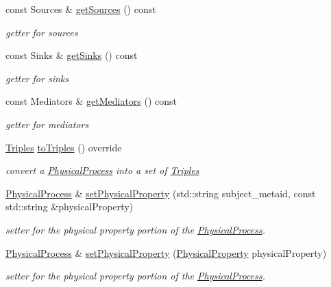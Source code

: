 \begin{DoxyCompactItemize}
const Sources \& \hyperlink{classomexmeta_1_1PhysicalProcess_ab5f3100febc21173775a2090bb57a0fb}{get\+Sources} () const
\begin{DoxyCompactList}\small\item\em getter for sources \end{DoxyCompactList}\item 
const Sinks \& \hyperlink{classomexmeta_1_1PhysicalProcess_a069e7caa05f346f90f413f650f081535}{get\+Sinks} () const
\begin{DoxyCompactList}\small\item\em getter for sinks \end{DoxyCompactList}\item 
const Mediators \& \hyperlink{classomexmeta_1_1PhysicalProcess_a349b76ad1831d2510904510583f0d7f2}{get\+Mediators} () const
\begin{DoxyCompactList}\small\item\em getter for mediators \end{DoxyCompactList}\item 
\hyperlink{classomexmeta_1_1Triples}{Triples} \hyperlink{classomexmeta_1_1PhysicalProcess_ab6f6af00fac2401f9a88e186fd1d897a}{to\+Triples} () override
\begin{DoxyCompactList}\small\item\em convert a \hyperlink{classomexmeta_1_1PhysicalProcess}{Physical\+Process} into a set of \hyperlink{classomexmeta_1_1Triples}{Triples} \end{DoxyCompactList}\item 
\hyperlink{classomexmeta_1_1PhysicalProcess}{Physical\+Process} \& \hyperlink{classomexmeta_1_1PhysicalProcess_ac875058d67408246aa28cf58dd77ccf6}{set\+Physical\+Property} (std\+::string subject\+\_\+metaid, const std\+::string \&physical\+Property)
\begin{DoxyCompactList}\small\item\em setter for the physical property portion of the \hyperlink{classomexmeta_1_1PhysicalProcess}{Physical\+Process}. \end{DoxyCompactList}\item 
\hyperlink{classomexmeta_1_1PhysicalProcess}{Physical\+Process} \& \hyperlink{classomexmeta_1_1PhysicalProcess_ac49bf4a1c21c6590a9d2af7ae93e13a7}{set\+Physical\+Property} (\hyperlink{classomexmeta_1_1PhysicalProperty}{Physical\+Property} physical\+Property)
\begin{DoxyCompactList}\small\item\em setter for the physical property portion of the \hyperlink{classomexmeta_1_1PhysicalProcess}{Physical\+Process}. \end{DoxyCompactList}\item 

\end{DoxyCompactItemize}
